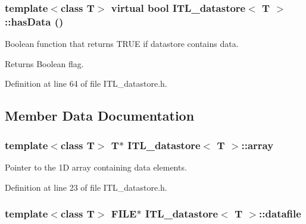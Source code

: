 \hypertarget{classITL__datastore_a43b1843d9ccedc71295116de3d31edb0}{
\subsubsection[{hasData}]{\setlength{\rightskip}{0pt plus 5cm}template$<$class T$>$ virtual bool {\bf ITL\_\-datastore}$<$ T $>$::hasData ()}}
\label{classITL__datastore_a43b1843d9ccedc71295116de3d31edb0}


Boolean function that returns TRUE if datastore contains data. 

\begin{DoxyReturn}{Returns}
Boolean flag. 
\end{DoxyReturn}


Definition at line 64 of file ITL\_\-datastore.h.



\subsection{Member Data Documentation}
\hypertarget{classITL__datastore_a63e6e00d86fa6f227686e0612518e26e}{
\subsubsection[{array}]{\setlength{\rightskip}{0pt plus 5cm}template$<$class T$>$ T$\ast$ {\bf ITL\_\-datastore}$<$ T $>$::{\bf array}}}
\label{classITL__datastore_a63e6e00d86fa6f227686e0612518e26e}


Pointer to the 1D array containing data elements. 



Definition at line 23 of file ITL\_\-datastore.h.

\hypertarget{classITL__datastore_a63d8cfcd308a6dd6763bd784c3870197}{
\subsubsection[{datafile}]{\setlength{\rightskip}{0pt plus 5cm}template$<$class T$>$ FILE$\ast$ {\bf ITL\_\-datastore}$<$ T $>$::{\bf datafile}}}
\label{classITL__datastore_a63d8cfcd308a6dd6763bd784c3870197}


